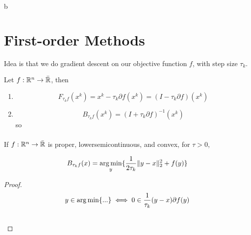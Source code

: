b\chapter{First-order Methods}
\label{cha:first-order-methods}

Idea is that we do gradient descent on our objective function $f$,
with step size $\tau_{k}$.

\begin{defn}
  \label{defn:first_order_methods:1}
  Let $f: \mathbb{R}^{n} \rightarrow \bar {\mathbb{R}}$, then
  \begin{enumerate}
  \item
    \begin{equation}
      \label{eq:1}
      F_{\tau_{k}f}(x^{k}) = x^{k} - \tau_{k} \partial f(x^{k}) = (I -
      \tau_{k} \partial f)(x^{k})
    \end{equation}
  \item
    \begin{equation}
      \label{eq:2}
      B_{\tau_{k} f}(x^{k}) = (I + \tau_{k} \partial f)^{-1}(x^{k})
    \end{equation} so
    \begin{align}
      \label{eq:3}
    \end{align} 
  \end{enumerate}
\end{defn}

\begin{proposition}
  If $f: \mathbb{R}^{n} \rightarrow \bar {\mathbb{R}}$ is proper, lowersemicontinuous,
  and convex, for $\tau > 0$, 

  \begin{equation}
    \label{eq:62}
    B_{\tau_{k} f}(x) = \operatorname*{arg\,min}_{y} \{
    \frac{1}{2\tau_{k}} \| y - x \|_{2}^{2} + f(y) \}
  \end{equation}
\end{proposition}

\begin{proof}
  \begin{align}
    \label{eq:72}
    y \in \operatorname*{arg\,min} \{ ... \} &\iff 0 \in \frac{1}{\tau_{k}}(y -x
    ) \partial f(y) \\
    &\
  \end{align}
\end{proof}

